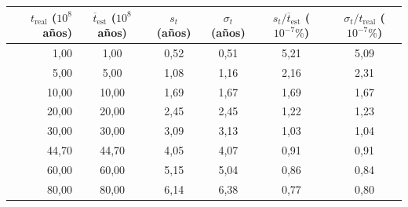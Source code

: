 \begin{tabular}{rccccc}
\toprule
$t_{\mathrm{real}}$ ($10^8$ años) & $\overline{t}_{\mathrm{est}}$ ($10^8$ años) & $s_t$ (años) & $\sigma_t$ (años) & $s_t/\overline{t}_{\mathrm{est}}$ ($10^{-7}\%$) & $\sigma_t/t_{\mathrm{real}}$ ($10^{-7}\%$) \\
\midrule
1,00 & 1,00 & 0,52 & 0,51 & 5,21 & 5,09 \\
5,00 & 5,00 & 1,08 & 1,16 & 2,16 & 2,31 \\
10,00 & 10,00 & 1,69 & 1,67 & 1,69 & 1,67 \\
20,00 & 20,00 & 2,45 & 2,45 & 1,22 & 1,23 \\
30,00 & 30,00 & 3,09 & 3,13 & 1,03 & 1,04 \\
44,70 & 44,70 & 4,05 & 4,07 & 0,91 & 0,91 \\
60,00 & 60,00 & 5,15 & 5,04 & 0,86 & 0,84 \\
80,00 & 80,00 & 6,14 & 6,38 & 0,77 & 0,80 \\
\bottomrule
\end{tabular}
